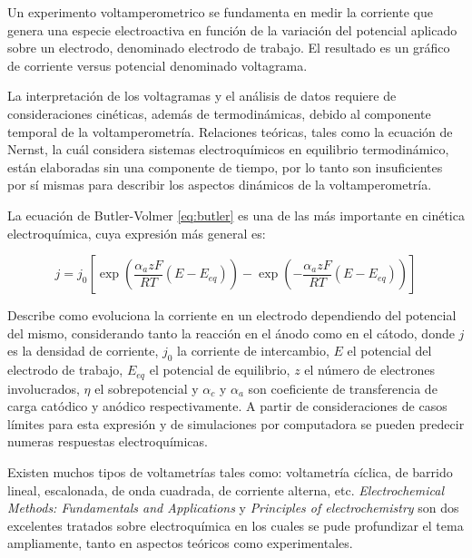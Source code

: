 		Un experimento voltamperometrico se fundamenta en medir la corriente que genera una especie electroactiva en función de la variación del potencial aplicado sobre un electrodo, denominado electrodo de trabajo. El resultado es un gráfico de corriente versus potencial denominado voltagrama.

		La interpretación de los voltagramas y el análisis de datos requiere de consideraciones cinéticas, además de termodinámicas, debido al componente temporal de la voltamperometría. Relaciones teóricas, tales como la ecuación de Nernst, la cuál considera sistemas electroquímicos en equilibrio termodinámico, están elaboradas sin una componente de tiempo, por lo tanto son insuficientes por sí mismas para describir los aspectos dinámicos de la voltamperometría.\cite{nnnicholson1964}

		La ecuación de Butler-Volmer \ref{eq:butler} es una de las más importante en cinética electroquímica, cuya expresión más general es: 

			\begin{equation}
			j=j_0\left[\exp\left(\frac{\alpha_azF}{RT}(E-E_{eq})\right)-\exp\left(-\frac{\alpha_azF}{RT}(E-E_{eq})\right)\right]
			\label{eq:butler}
			\end{equation}


		\noindent Describe como evoluciona la corriente en un electrodo dependiendo del potencial del mismo, considerando tanto la reacción en el ánodo como en el cátodo, donde $j$ es la densidad de corriente, $j_0$ la corriente de intercambio, $E$ el potencial del electrodo de trabajo, $E_{eq}$ el potencial de equilibrio, $z$ el número de electrones involucrados, $\eta$ el sobrepotencial y $\alpha_c$ y $\alpha_a$ son coeficiente de transferencia de carga catódico y anódico respectivamente.\cite{Wi2000} A partir de consideraciones de casos límites para esta expresión y de simulaciones por computadora se pueden predecir numeras respuestas electroquímicas.

		Existen muchos tipos de voltametrías tales como: voltametría cíclica, de barrido lineal, escalonada, de onda cuadrada, de corriente alterna, etc. \textit{Electrochemical Methods: Fundamentals and Applications} y  \textit{Principles of electrochemistry} son dos excelentes tratados sobre electroquímica en los cuales se pude profundizar el tema ampliamente, tanto en aspectos teóricos como experimentales.

